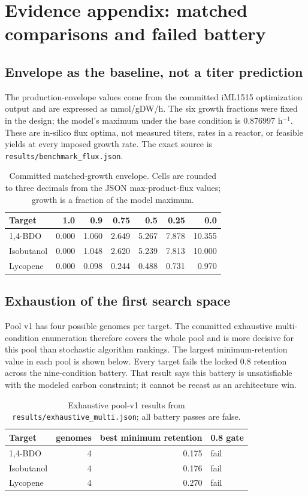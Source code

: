 \section{Evidence appendix: matched comparisons and failed battery}
\subsection{Envelope as the baseline, not a titer prediction}
The production-envelope values come from the committed iML1515 optimization output and are expressed as mmol/gDW/h. The six growth fractions were fixed in the design; the model's maximum under the base condition is 0.876997 h$^{-1}$. These are in-silico flux optima, not measured titers, rates in a reactor, or feasible yields at every imposed growth rate. The exact source is \texttt{results/benchmark\_flux.json}.
\begin{table}[!htbp]\centering\small\caption{Committed matched-growth envelope. Cells are rounded to three decimals from the JSON max-product-flux values; growth is a fraction of the model maximum.}\begin{tabular}{lrrrrrr}\hline Target & 1.0 & 0.9 & 0.75 & 0.5 & 0.25 & 0.0 \\\hline
1,4-BDO & 0.000 & 1.060 & 2.649 & 5.267 & 7.878 & 10.355 \\
Isobutanol & 0.000 & 1.048 & 2.620 & 5.239 & 7.813 & 10.000 \\
Lycopene & 0.000 & 0.098 & 0.244 & 0.488 & 0.731 & 0.970 \\
\hline\end{tabular}\end{table}
\subsection{Exhaustion of the first search space}
Pool v1 has four possible genomes per target. The committed exhaustive multi-condition enumeration therefore covers the whole pool and is more decisive for this pool than stochastic algorithm rankings. The largest minimum-retention value in each pool is shown below. Every target fails the locked 0.8 retention across the nine-condition battery. That result says this battery is unsatisfiable with the modeled carbon constraint; it cannot be recast as an architecture win.
\begin{table}[!htbp]\centering\small\caption{Exhaustive pool-v1 results from \texttt{results/exhaustive\_multi.json}; all battery passes are false.}\begin{tabular}{lrrl}\hline Target & genomes & best minimum retention & 0.8 gate \\\hline
1,4-BDO & 4 & 0.175 & fail \\
Isobutanol & 4 & 0.176 & fail \\
Lycopene & 4 & 0.270 & fail \\
\hline\end{tabular}\end{table}
